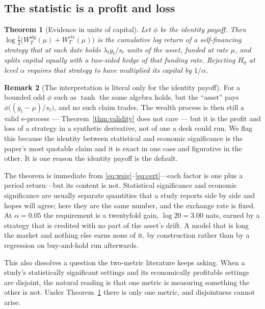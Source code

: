 \documentclass{article}
\theoremstyle{plain}
\newtheorem{theorem}{Theorem}
\theoremstyle{definition}
\newtheorem{remark}[theorem]{Remark}
\begin{document}
\subsection{The statistic is a profit and loss}

\begin{theorem}[Evidence in units of capital]
\label{thm:pnl}
Let $\phi$ be the identity payoff. Then
$\log\tfrac12\big(W^{\mathrm{sig}}_T(\mu)+W^{\mathrm{ctr}}_T(\mu)\big)$ is the cumulative
log return of a self-financing strategy that at each date holds $\lambda_tg_t/s_t$ units of
the asset, funded at rate $\mu$, and splits capital equally with a two-sided hedge of that
funding rate. Rejecting $H_0$ at level $\alpha$ requires that strategy to have multiplied its
capital by $1/\alpha$.
\end{theorem}

\begin{remark}[The interpretation is literal only for the identity payoff]
\label{rem:tradeable}
For a bounded odd $\phi$ such as $\tanh$ the same algebra holds, but the ``asset'' pays
$\phi\big((y_t-\mu)/s_t\big)$, and no such claim trades. The wealth process is then still a
valid e-process --- Theorem~\ref{thm:validity} does not care --- but it is the profit and loss
of a strategy in a synthetic derivative, not of one a desk could run. We flag this because the
identity between statistical and economic significance is the paper's most quotable claim and
it is exact in one case and figurative in the other. It is one reason the identity payoff is
the default.
\end{remark}

The theorem is immediate from \eqref{eq:wsig}--\eqref{eq:cert}---each factor is one plus a
period return---but its content is not. Statistical significance and economic significance
are usually separate quantities that a study reports side by side and hopes will agree; here
they are the same number, and the exchange rate is fixed. At $\alpha=0.05$ the requirement
is a twentyfold gain, $\log 20 = 3.00$ nats, earned by a strategy that is credited with no
part of the asset's drift. A model that is long the market and nothing else earns none of
it, by construction rather than by a regression on buy-and-hold run afterwards.

This also dissolves a question the two-metric literature keeps asking. When a study's
statistically significant settings and its economically profitable settings are disjoint,
the natural reading is that one metric is measuring something the other is not. Under
Theorem~\ref{thm:pnl} there is only one metric, and disjointness cannot arise.
\end{document}
